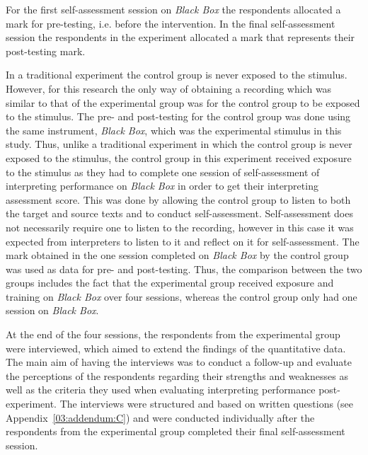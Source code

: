 \documentclass[output=paper]{langsci/langscibook}
\begin{document}
For the first self-assessment session on \textit{Black Box} the respondents allocated a mark for pre-testing, i.e. before the intervention. In the final self-assessment session the respondents in the experiment allocated a mark that represents their post-testing mark. 

In a traditional experiment the control group is never exposed to the stimulus. However, for this research the only way of obtaining a recording which was similar to that of the experimental group was for the control group to be exposed to the stimulus. The pre- and post-testing for the control group was done using the same instrument, \textit{Black Box}, which was the experimental stimulus in this study. Thus, unlike a traditional experiment in which the control group is never exposed to the stimulus, the control group in this experiment received exposure to the stimulus as they had to complete one session of self-assessment of interpreting performance on \textit{Black Box} in order to get their interpreting assessment score. This was done by allowing the control group to listen to both the target and source texts and to conduct self-assessment. Self-assessment does not necessarily require one to listen to the recording, however in this case it was expected from interpreters to listen to it and reflect on it for self-assessment. The mark obtained in the one session completed on \textit{Black Box} by the control group was used as data for pre- and post-testing. Thus, the comparison between the two groups includes the fact that the experimental group received exposure and training on \textit{Black Box} over four sessions, whereas the control group only had one session on \textit{Black Box}.

At the end of the four sessions, the respondents from the experimental group were interviewed, which aimed to extend the findings of the quantitative data. The main aim of having the interviews was to conduct a follow-up and evaluate the perceptions of the respondents regarding their strengths and weaknesses as well as the criteria they used when evaluating interpreting performance post-experiment. The interviews were structured and based on written questions (see Appendix~\ref{03:addendum:C}) and were conducted individually after the respondents from the experimental group completed their final self-assessment session.
\end{document}
